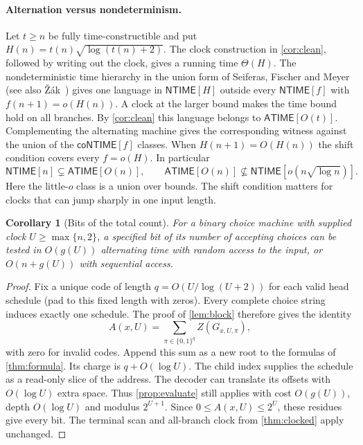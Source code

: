 \documentclass[11pt]{article}
\newtheorem{corollary}[theorem]{Corollary}
\theoremstyle{definition}
\theoremstyle{remark}
\newcommand{\NTIME}{\mathsf{NTIME}}
\newcommand{\ATIME}{\mathsf{ATIME}}
\begin{document}
\paragraph{Alternation versus nondeterminism.}
Let $t\ge n$ be fully time-constructible and put
$H(n)=t(n)\sqrt{\log(t(n)+2)}$. The clock construction in
\cref{cor:clean}, followed by writing out the clock, gives a running
time $\Theta(H)$. The nondeterministic time hierarchy in the union
form of Seiferas, Fischer and Meyer~\cite[Corollary~4.1]{SFM}
(see also \v{Z}\'ak~\cite{Zak}) gives one language in $\NTIME[H]$
outside every $\NTIME[f]$ with $f(n+1)=o(H(n))$. A clock at the larger
bound makes the time bound hold on all branches.
By \cref{cor:clean} this language belongs to $\ATIME[O(t)]$.
Complementing the alternating machine gives the corresponding witness
against the union of the $\mathsf{coNTIME}[f]$ classes.
When $H(n+1)=O(H(n))$ the shift condition covers every $f=o(H)$.
In particular
\[
 \NTIME[n]\subsetneq\ATIME[O(n)],\qquad
 \ATIME[O(n)]\not\subseteq\NTIME[o(n\sqrt{\log n})].
\]
Here the little-$o$ class is a union over bounds. The shift condition
matters for clocks that can jump sharply in one input length.

\begin{corollary}[Bits of the total count]\label{cor:total-count}
For a binary choice machine with supplied clock $U\ge\max\{n,2\}$,
a specified bit of its number of accepting choices can be tested in
$O(g(U))$ alternating time with random access to the input, or
$O(n+g(U))$ with sequential access.
\end{corollary}
\begin{proof}
Fix a unique code of length $q=O(U/\log(U+2))$ for each valid head
schedule (pad to this fixed length with zeros). Every complete choice
string induces exactly one schedule. The proof of \cref{lem:block}
therefore gives the identity
\[
 A(x,U)=\sum_{\pi\in\{0,1\}^q} Z(G_{x,U,\pi}),
\]
with zero for invalid codes. Append this sum as a new root to the
formulas of \cref{thm:formula}. Its charge is $q+O(\log U)$.
The child index supplies the schedule as a read-only slice of the
address. The decoder can translate its offsets with $O(\log U)$
extra space. Thus \cref{prop:evaluate} still applies with cost
$O(g(U))$, depth $O(\log U)$ and modulus $2^{U+1}$. Since
$0\le A(x,U)\le2^U$, these residues give every bit. The terminal
scan and all-branch clock from \cref{thm:clocked} apply unchanged.
\end{proof}
\end{document}
